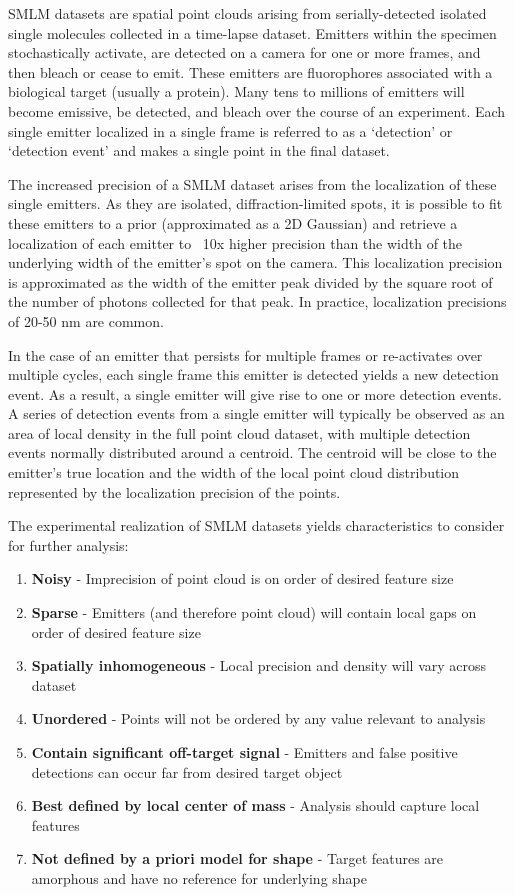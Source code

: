 \documentclass[10pt,a4paper]{article}
\begin{document}
SMLM datasets are spatial point clouds arising from serially-detected isolated single molecules collected in a time-lapse dataset.  Emitters within the specimen stochastically activate, are detected on a camera for one or more frames, and then bleach or cease to emit.  These emitters are fluorophores associated with a biological target (usually a protein).  Many tens to millions of emitters will become emissive, be detected, and bleach over the course of an experiment.  Each single emitter localized in a single frame is referred to as a `detection' or `detection event' and makes a single point in the final dataset. 

The increased precision of a SMLM dataset arises from the localization of these single emitters.  As they are isolated, diffraction-limited spots, it is possible to fit these emitters to a prior (approximated as a 2D Gaussian) and retrieve a localization of each emitter to ~10x higher precision than the width of the underlying width of the emitter's spot on the camera.  This localization precision is approximated as the width of the emitter peak divided by the square root of the number of photons collected for that peak.  In practice, localization precisions of 20-50 nm are common.   

In the case of an emitter that persists for multiple frames or re-activates over multiple cycles, each single frame this emitter is detected yields a new detection event.  As a result, a single emitter will give rise to one or more detection events.  A series of detection events from a single emitter will typically be observed as an area of local density in the full point cloud dataset, with multiple detection events normally distributed around a centroid.  The centroid will be close to the emitter's true location and the width of the local point cloud distribution represented by the localization precision of the points. 

The experimental realization of SMLM datasets yields characteristics to consider for further analysis:
\begin{enumerate}
\item \textbf{Noisy} - Imprecision of point cloud is on order of desired feature size
\item \textbf{Sparse} - Emitters (and therefore point cloud) will contain local gaps on order of desired feature size
\item \textbf{Spatially inhomogeneous} - Local precision and density will vary across dataset
\item \textbf{Unordered} - Points will not be ordered by any value relevant to analysis
\item \textbf{Contain significant off-target signal} - Emitters and false positive detections can occur far from desired target object 
\item \textbf{Best defined by local center of mass} - Analysis should capture local features 
\item \textbf{Not defined by a priori model for shape} - Target features are amorphous and have no reference for underlying shape
\end{enumerate}
\end{document}
